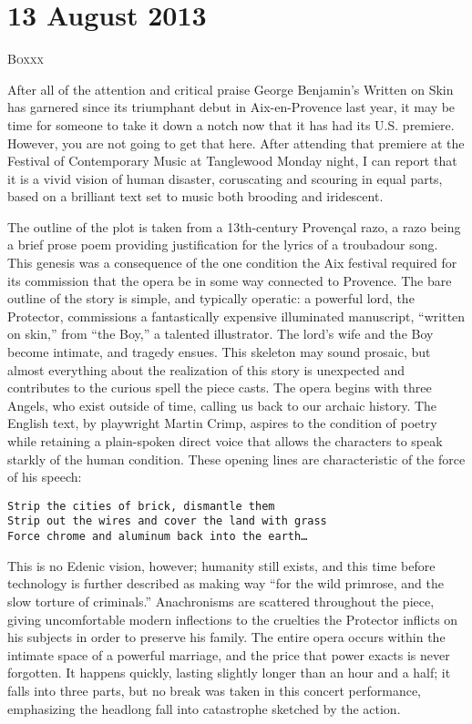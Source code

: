 \chapter{13 August 2013}

\textsc{Boxxx}

After all of the attention and critical praise George Benjamin’s Written on Skin has garnered since its triumphant debut in Aix-en-Provence last year, it may be time for someone to take it down a notch now that it has had its U.S. premiere. However, you are not going to get that here. After attending that premiere at the Festival of Contemporary Music at Tanglewood Monday night, I can report that it is a vivid vision of human disaster, coruscating and scouring in equal parts, based on a brilliant text set to music both brooding and iridescent.

The outline of the plot is taken from a 13th-century Provençal razo, a razo being a brief prose poem providing justification for the lyrics of a troubadour song. This genesis was a consequence of the one condition the Aix festival required for its commission that the opera be in some way connected to Provence. The bare outline of the story is simple, and typically operatic: a powerful lord, the Protector, commissions a fantastically expensive illuminated manuscript, “written on skin,” from “the Boy,” a talented illustrator. The lord’s wife and the Boy become intimate, and tragedy ensues. This skeleton may sound prosaic, but almost everything about the realization of this story is unexpected and contributes to the curious spell the piece casts. The opera begins with three Angels, who exist outside of time, calling us back to our archaic history. The English text, by playwright Martin Crimp, aspires to the condition of poetry while retaining a plain-spoken direct voice that allows the characters to speak starkly of the human condition. These opening lines are characteristic of the force of his speech:

\begin{verbatim}
Strip the cities of brick, dismantle them
Strip out the wires and cover the land with grass
Force chrome and aluminum back into the earth…
\end{verbatim}

This is no Edenic vision, however; humanity still exists, and this time before technology is further described as making way “for the wild primrose, and the slow torture of criminals.” Anachronisms are scattered throughout the piece, giving uncomfortable modern inflections to the cruelties the Protector inflicts on his subjects in order to preserve his family. The entire opera occurs within the intimate space of a powerful marriage, and the price that power exacts is never forgotten. It happens quickly, lasting slightly longer than an hour and a half; it falls into three parts, but no break was taken in this concert performance, emphasizing the headlong fall into catastrophe sketched by the action.

